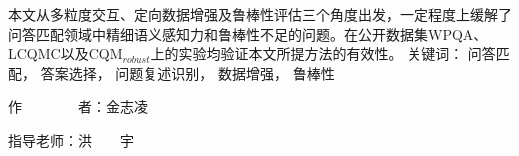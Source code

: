 \begin{cabstract}
	本文从多粒度交互、定向数据增强及鲁棒性评估三个角度出发，一定程度上缓解了问答匹配领域中精细语义感知力和鲁棒性不足的问题。在公开数据集WPQA、LCQMC以及CQM$_{robust}$上的实验均验证本文所提方法的有效性。
	\vskip 10bp
	\noindent
	{\heiti{} 关键词：}
	问答匹配，
	答案选择，
	问题复述识别，
	数据增强，
	鲁棒性
	
	\begin{flushright}
		{\heiti{} 作~~~~~~~~者：}金志凌

		{\heiti{} 指导老师：}洪~~~~宇
	\end{flushright}

\end{cabstract}


